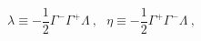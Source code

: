 \begin{equation}
\lambda \equiv - \frac{1}{2} \Gamma^- \Gamma^+ \Lambda ~,~~~
\eta \equiv - \frac{1}{2} \Gamma^+ \Gamma^- \Lambda ~,
\label{d1/2-d}
\end{equation}

